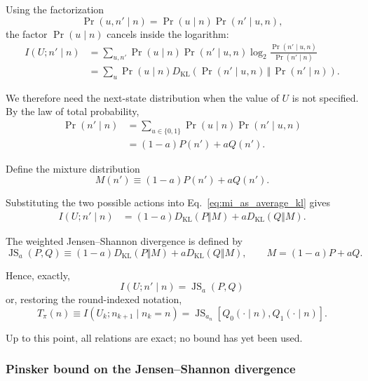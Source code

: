 Using the factorization
\[
\Pr(u,n'\mid n)
=
\Pr(u\mid n)\Pr(n'\mid u,n),
\]
the factor \(\Pr(u\mid n)\) cancels inside the logarithm:
\begin{align}
I(U;n'\mid n)
&=
\sum_{u,n'}
\Pr(u\mid n)\Pr(n'\mid u,n)
\log_2
\frac{
\Pr(n'\mid u,n)
}{
\Pr(n'\mid n)
}
\nonumber\\
&=
\sum_u
\Pr(u\mid n)
D_{\mathrm{KL}}
\left(
\Pr(n'\mid u,n)
\,\Vert\,
\Pr(n'\mid n)
\right).
\label{eq:mi_as_average_kl}
\end{align}

We therefore need the next-state distribution when the value of \(U\)
is not specified. By the law of total probability,
\begin{align}
\Pr(n'\mid n)
&=
\sum_{u\in\{0,1\}}
\Pr(u\mid n)\Pr(n'\mid u,n)
\nonumber\\
&=
(1-a)P(n')+aQ(n').
\end{align}

Define the mixture distribution
\begin{equation}
M(n')
\equiv
(1-a)P(n')+aQ(n').
\label{eq:mixture_M}
\end{equation}

Substituting the two possible actions into
Eq.~\eqref{eq:mi_as_average_kl} gives
\begin{align}
I(U;n'\mid n)
&=
(1-a)D_{\mathrm{KL}}(P\Vert M)
+
aD_{\mathrm{KL}}(Q\Vert M).
\label{eq:mi_two_kl}
\end{align}

The weighted Jensen--Shannon divergence is defined by
\begin{equation}
\operatorname{JS}_{a}(P,Q)
\equiv
(1-a)D_{\mathrm{KL}}(P\Vert M)
+
aD_{\mathrm{KL}}(Q\Vert M),
\qquad
M=(1-a)P+aQ.
\end{equation}

Hence, exactly,
\begin{equation}
\boxed{
I(U;n'\mid n)
=
\operatorname{JS}_{a}(P,Q)
}
\label{eq:mi_equals_js_short}
\end{equation}
or, restoring the round-indexed notation,
\begin{equation}
\boxed{
T_\pi(n)
\equiv
I(U_k;n_{k+1}\mid n_k=n)
=
\operatorname{JS}_{a_n}
\left[
Q_0(\cdot\mid n),
Q_1(\cdot\mid n)
\right].
}
\label{eq:mi_equals_js}
\end{equation}

Up to this point, all relations are exact; no bound has yet been used.

\subsubsection{Pinsker bound on the Jensen--Shannon divergence}

